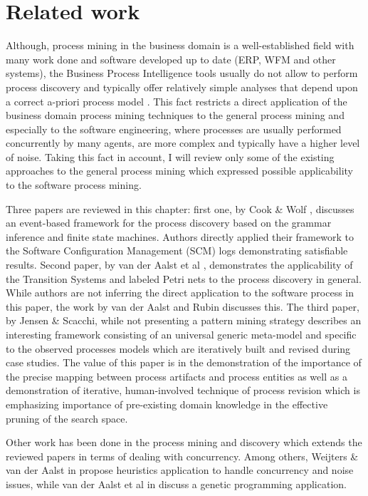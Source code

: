 \chapter{Related work} \label{related.work}
Although, process mining in the business domain is a well-established field with many work done and software developed up to date (ERP, WFM and other systems), the Business Process Intelligence tools usually do not allow to perform process discovery and typically offer relatively simple analyses that depend upon a correct a-priori process model \cite{citeulike:3718014} \cite{citeulike:5044991}. This fact restricts a direct application of the business domain process mining techniques to the general process mining and especially to the software engineering, where processes are usually performed concurrently by many agents, are more complex and typically have a higher level of noise. Taking this fact in account, I will review only some of the existing approaches to the general process mining which expressed possible applicability to the software process mining. 

Three papers are reviewed in this chapter: first one, by Cook \& Wolf \cite{citeulike:328044}, discusses an event-based framework for the process discovery based on the grammar inference and finite state machines. Authors directly applied their framework to the Software Configuration Management (SCM) logs demonstrating satisfiable results. Second paper, by van der Aalst et al \cite{citeulike:3718014}, demonstrates the applicability of the Transition Systems and labeled Petri nets to the process discovery in general. While authors are not inferring the direct application to the software process in this paper, the work by van der Aalst and Rubin \cite{citeulike:1885717} discusses this. The third paper, by Jensen \& Scacchi, while not presenting a pattern mining strategy describes an interesting framework consisting of an universal generic meta-model and specific to the observed processes models which are iteratively built and revised during case studies. The value of this paper is in the demonstration of the importance of the precise mapping between process artifacts and process entities as well as a demonstration of iterative, human-involved technique of process revision which is emphasizing importance of pre-existing domain knowledge in the effective pruning of the search space.

Other work has been done in the process mining and discovery which extends the reviewed papers in terms of dealing with concurrency. Among others, Weijters \& van der Aalst in \cite{citeulike:5128101} propose heuristics application to handle concurrency and noise issues, while van der Aalst et al in \cite{citeulike:5128101} discuss a genetic programming application.